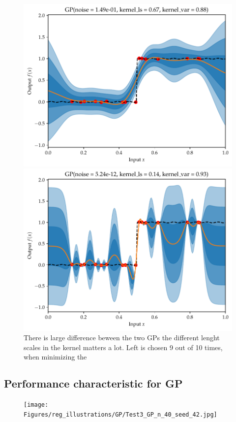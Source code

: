 \begin{figure}[h]
    \centering
    \begin{minipage}[b]{0.49\textwidth}
     \includegraphics[width=\textwidth]{Pictures/GP_vs_BNN1.pdf}
    \end{minipage}
    \hfill
    \begin{minipage}[b]{0.49\textwidth}
      \includegraphics[width=\textwidth]{Pictures/GP_vs_BNN1_b.pdf}
     \end{minipage}
     \caption{There is large difference beween the two GPs the different lenght scales in the kernel
     matters a lot. Left is chosen 9 out of 10 times, when minimizing the }
\end{figure}


\subsection{Performance characteristic for GP}
\begin{testexample}
    \begin{figure}[H]
        \texttt{[image: Figures/reg\_illustrations/GP/Test3\_GP\_n\_40\_seed\_42.jpg]}
    \end{figure}
\end{testexample}